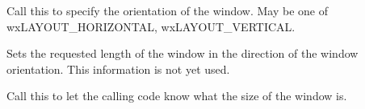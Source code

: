 
Call this to specify the orientation of the window. May be one of wxLAYOUT\_HORIZONTAL,
wxLAYOUT\_VERTICAL.

\label{wxquerylayoutinfoeventsetrequestedlength}


Sets the requested length of the window in the direction of the window orientation. This information
is not yet used.

\label{wxquerylayoutinfoeventsetsize}


Call this to let the calling code know what the size of the window is.

